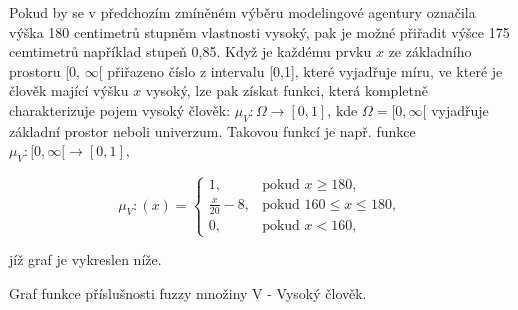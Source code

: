      Pokud by se v předchozím zmíněném výběru modelingové agentury označila výška 180 centimetr\r u stupněm vlastnosti \clqq vysoký\crqq {}, pak je možné přiřadit výšce 175 cemtimetr\r u například stupe\v n 0,85. Když je každému prvku $x$ ze základního prostoru [0, $\infty$[ přiřazeno číslo z intervalu [0,1], které vyjadřuje míru, ve které je člověk mající výšku $x$ vysoký, lze pak získat funkci, která kompletně charakterizuje pojem vysoký člověk: $\mu_V: \Omega \rightarrow [0,1]$, kde $\Omega = [0, \infty[$ vyjadřuje základní prostor neboli univerzum. Takovou funkcí je např. funkce $\mu_V:  [0, \infty[ \rightarrow [0,1]$, 

    $$\mu_V:(x)=\begin{cases} 1, & \mbox{pokud }  x \geq 180,\\ 
    \frac{x}{20} - 8, & \mbox{pokud } 160 \leq x \leq 180,\\
    0, & \mbox{pokud } x < 160,  \end{cases}$$

    jíž graf je vykreslen níže.

    \begin{graph} Graf funkce příslušnosti fuzzy množiny V - \clqq Vysoký člověk\crqq.\\
    \end{graph}



